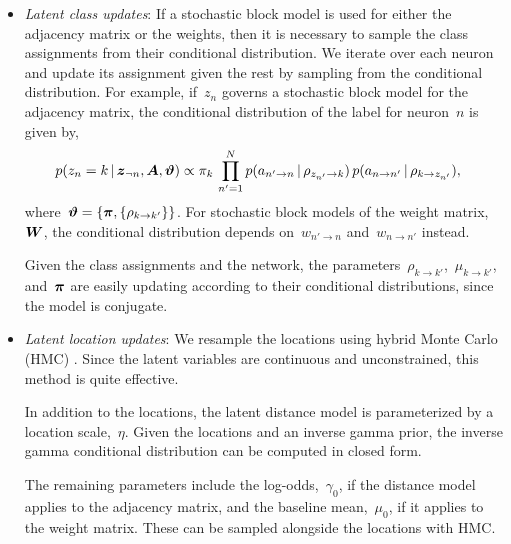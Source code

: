 \begin{itemize}
  \item \textit{Latent class updates}:
    If a stochastic block model is used for either the adjacency matrix
    or the weights, then it is necessary to sample the class assignments
    from their conditional distribution. We iterate over each neuron and
    update its assignment given the rest by sampling from the conditional
    distribution. For example, if~$z_n$ governs a stochastic block model
    for the adjacency matrix, the conditional distribution of the label
    for neuron~$n$ is given by,
    \begin{align}
      p(z_n = k \,|\, \boldsymbol{z}_{\neg n}, \boldsymbol{A}, \boldsymbol{\vartheta})
      &\propto \pi_{k} \,
      \prod_{n'=1}^N p(a_{n' \to n} \,|\, \rho_{z_{n'} \to k}) \,
                    p(a_{n \to n'} \,|\, \rho_{k \to z_{n'}}),
    \end{align}
    where~$\boldsymbol{\vartheta} = \{\boldsymbol{\pi}, \{\rho_{k \to k'}\} \}$. For stochastic block
    models of the weight matrix,~$\boldsymbol{W}$, the conditional distribution
    depends on~$w_{n' \to n}$ and~$w_{n \to n'}$ instead.

    Given the class assignments and the network, the
    parameters~$\rho_{k \to k'}$,~$\mu_{k \to k'}$, and~$\boldsymbol{\pi}$ are easily updating
    according to their conditional distributions, since the model is
    conjugate.
    
  \item \textit{Latent location updates}:
    We resample the locations using hybrid Monte Carlo (HMC) \citep{Neal10}.
    Since the latent variables are continuous and unconstrained,
    this method is quite effective.

    In addition to the locations, the latent distance model is parameterized
    by a location scale,~$\eta$. Given the locations and an inverse gamma
    prior, the inverse gamma conditional distribution can be computed in
    closed form.
    
    The remaining parameters include the log-odds,~$\gamma_0$, if the
    distance model applies to the adjacency matrix, and the baseline
    mean,~$\mu_0$, if it applies to the weight matrix. These can be
    sampled alongside the locations with HMC.  
\end{itemize}

